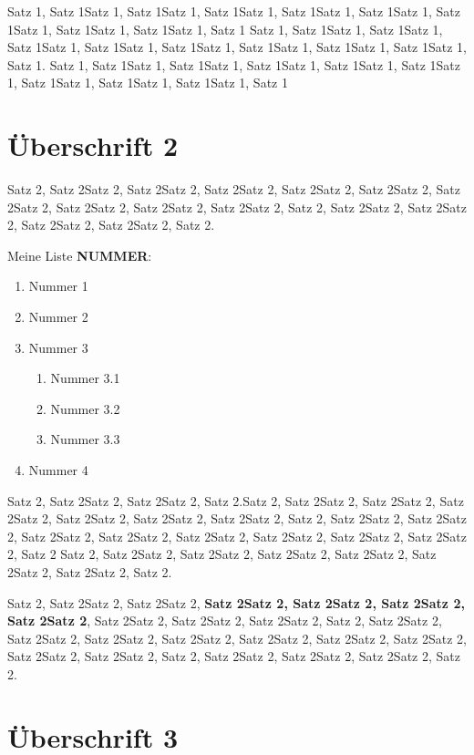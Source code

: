     Satz 1, Satz 1Satz 1, Satz 1Satz 1, Satz 1Satz 1, Satz 1Satz 1, Satz 1Satz 1, Satz 1Satz 1, Satz 1Satz 1, Satz 1Satz 1, Satz 1
    Satz 1, Satz 1Satz 1, Satz 1Satz 1, Satz 1Satz 1, Satz 1Satz 1, Satz 1Satz 1, Satz 1Satz 1, Satz 1Satz 1, Satz 1Satz 1, Satz 1.
    Satz 1, Satz 1Satz 1, Satz 1Satz 1, Satz 1Satz 1, Satz 1Satz 1, Satz 1Satz 1, Satz 1Satz 1, Satz 1Satz 1, Satz 1Satz 1, Satz 1

    \section{Überschrift 2}

    Satz 2, Satz 2Satz 2, Satz 2Satz 2, Satz 2Satz 2, Satz 2Satz 2, Satz 2Satz 2, Satz 2Satz 2, Satz 2Satz 2, Satz 2Satz 2, Satz 2Satz 2, 
    Satz 2, Satz 2Satz 2, Satz 2Satz 2, Satz 2Satz 2, Satz 2Satz 2, Satz 2.

    Meine Liste \textbf{NUMMER}:
    \begin{enumerate}
        \item Nummer 1
        \item Nummer 2
        \item Nummer 3
        \begin{enumerate}
            \item Nummer 3.1
            \item Nummer 3.2
            \item Nummer 3.3
        \end{enumerate}
        \item Nummer 4
    \end{enumerate}

    Satz 2, Satz 2Satz 2, Satz 2Satz 2, Satz 2.Satz 2, Satz 2Satz 2, Satz 2Satz 2, Satz 2Satz 2, Satz 2Satz 2, Satz 2Satz 2, Satz 2Satz 2, 
    Satz 2, Satz 2Satz 2, Satz 2Satz 2, Satz 2Satz 2, Satz 2Satz 2, Satz 2Satz 2, Satz 2Satz 2, Satz 2Satz 2, Satz 2Satz 2, Satz 2
    Satz 2, Satz 2Satz 2, Satz 2Satz 2, Satz 2Satz 2, Satz 2Satz 2, Satz 2Satz 2, Satz 2Satz 2, Satz 2.


    Satz 2, Satz 2Satz 2, Satz 2Satz 2,  \textbf{Satz 2Satz 2, Satz 2Satz 2, Satz 2Satz 2, Satz 2Satz 2}, Satz 2Satz 2, Satz 2Satz 2, Satz 2Satz 2,
    Satz 2, Satz 2Satz 2, Satz 2Satz 2, Satz 2Satz 2, Satz 2Satz 2, Satz 2Satz 2, Satz 2Satz 2, Satz 2Satz 2, Satz 2Satz 2, Satz 2Satz 2, 
    Satz 2, Satz 2Satz 2, Satz 2Satz 2, Satz 2Satz 2, Satz 2.

    \section{Überschrift 3}

